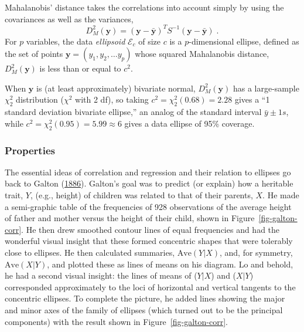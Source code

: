 \documentclass[
  letterpaper,
  10pt,
  krantz2]{krantz}
\begin{document}
Mahalanobis' distance takes the correlations into account simply by
using the covariances as well as the variances, \[
D_M^2 (\mathbf{y}) = (\mathbf{y} - \bar{\mathbf{y}})^T S^{-1} (\mathbf{y} - \bar{\mathbf{y}}) \; .
\] For \(p\) variables, the data \emph{ellipsoid} \(\mathcal{E}_c\) of
size \(c\) is a \(p\)-dimensional ellipse, defined as the set of points
\(\mathbf{y} = (y_1, y_2, \dots y_p)\) whose squared Mahalanobis
distance, \(D_M^2 ( \mathbf{y} )\) is less than or equal to \(c^2\).

When \(\mathbf{y}\) is (at least approximately) bivariate normal,
\(D_M^2(\mathbf{y})\) has a large-sample \(\chi^2_2\) distribution
(\(\chi^2\) with 2 df), so taking \(c^2 = \chi^2_2 (0.68) = 2.28\) gives
a ``1 standard deviation bivariate ellipse,'' an analog of the standard
interval \(\bar{y} \pm 1 s\), while
\(c^2 = \chi^2_2 (0.95) = 5.99 \approx 6\) gives a data ellipse of 95\%
coverage.

\hypertarget{properties}{%
\subsubsection{Properties}\label{properties}}

The essential ideas of correlation and regression and their relation to
ellipses go back to Galton (\protect\hyperlink{ref-Galton:1886}{1886}).
Galton's goal was to predict (or explain) how a heritable trait, \(Y\),
(e.g., height) of children was related to that of their parents, \(X\).
He made a semi-graphic table of the frequencies of 928 observations of
the average height of father and mother versus the height of their
child, shown in Figure~\ref{fig-galton-corr}. He then drew smoothed
contour lines of equal frequencies and had the wonderful visual insight
that these formed concentric shapes that were tolerably close to
ellipses. He then calculated summaries, \(\text{Ave}(Y | X)\), and, for
symmetry, \(\text{Ave}(X | Y)\), and plotted these as lines of means on
his diagram. Lo and behold, he had a second visual insight: the lines of
means of (\(Y | X\)) and (\(X | Y\)) corresponded approximately to the
loci of horizontal and vertical tangents to the concentric ellipses. To
complete the picture, he added lines showing the major and minor axes of
the family of ellipses (which turned out to be the principal components)
with the result shown in Figure~\ref{fig-galton-corr}.
\end{document}
